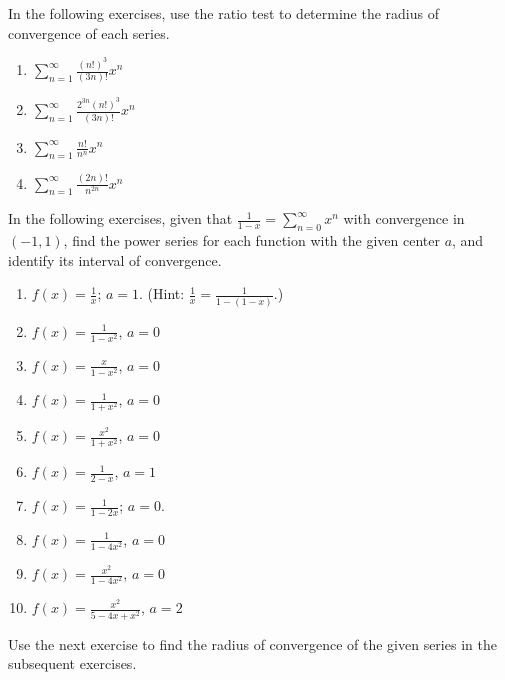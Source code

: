 \documentclass{exercises}
\begin{document}
In the following exercises, use the ratio test to determine the radius of convergence of each series.

\begin{enumerate}[resume]
\item $\sum_{n=1}^{\infty}\frac{{(n!)}^{3}}{(3n)!}x^{n}$
\item $\sum_{n=1}^{\infty}\frac{2^{3n}{(n!)}^{3}}{(3n)!}x^{n}$
\item $\sum_{n=1}^{\infty}\frac{n!}{n^{n}}x^{n}$
\item $\sum_{n=1}^{\infty}\frac{(2n)!}{n^{2n}}x^{n}$
\end{enumerate}

In the following exercises, given that $\frac{1}{1-x}=\sum_{n=0}^{\infty}x^{n}$ with convergence in $(-1,1)$, find the power series for each function with the given center $a$, and identify its interval of convergence.

\begin{enumerate}[resume]
\item $f(x)=\frac{1}{x}$; $a=1$. (Hint: $\frac{1}{x}=\frac{1}{1-(1-x)}$.)
\item $f(x)=\frac{1}{1-x^{2}}$, $a=0$
\item $f(x)=\frac{x}{1-x^{2}}$, $a=0$
\item $f(x)=\frac{1}{1+x^{2}}$, $a=0$
\item $f(x)=\frac{x^{2}}{1+x^{2}}$, $a=0$
\item $f(x)=\frac{1}{2-x}$, $a=1$
\item $f(x)=\frac{1}{1-2x}$; $a=0$.
\item $f(x)=\frac{1}{1-4x^{2}}$, $a=0$
\item $f(x)=\frac{x^{2}}{1-4x^{2}}$, $a=0$
\item $f(x)=\frac{x^{2}}{5-4x+x^{2}}$, $a=2$
\end{enumerate}

Use the next exercise to find the radius of convergence of the given series in the subsequent exercises.
\end{document}
